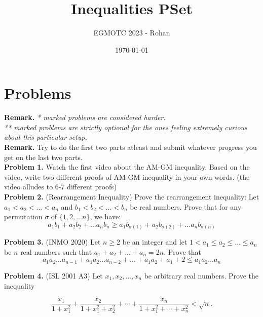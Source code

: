 \documentclass[12pt]{article}
\title{Inequalities PSet}
\author{EGMOTC 2023 - Rohan}
\date{\today}
\begin{document}
\maketitle

\newcommand{\localtextbulletone}{\textcolor{black}{\raisebox{.45ex}{\rule{.6ex}{.6ex}}}}
\renewcommand{\labelitemi}{\localtextbulletone}

\section*{Problems}
\vspace{1cm}
\thispagestyle{empty}

\textbf{Remark.} \textit{* marked problems are considered harder.\\ ** marked problems are strictly optional for the ones feeling extremely curious about this particular setup.\\}
\textbf{Remark.} Try to do the first two parts atleast and submit whatever progress you get on the last two parts.\\

\textbf{Problem 1.} Watch the first video about the AM-GM inequality. Based on the video, write two different proofs of AM-GM inequality in your own words. (the video alludes to 6-7 different proofs)\\

\textbf{Problem 2.} (Rearrangement Inequality) Prove the rearrangement inequality:
Let $a_1<a_2<\ldots <a_n$ and $b_1<b_2<\ldots < b_n$ be real numbers. Prove that for any permutation $\sigma$ of $\{1,2,\ldots n\}$, we have: \[a_1b_1+a_2b_2+\ldots a_nb_n \ge a_1b_{\sigma(1)}+a_2b_{\sigma(2)}+\ldots a_nb_{\sigma(n)}\]

\textbf{Problem 3.} (INMO 2020) Let $n \geqslant 2$ be an integer and let $1<a_1 \le a_2 \le \dots \le a_n$ be $n$ real numbers such that $a_1+a_2+\dots+a_n=2n$. Prove that \[a_1a_2\dots a_{n-1}+a_1a_2\dots a_{n-2}+\dots+a_1a_2+a_1+2 \leq a_1a_2\dots a_n\]

\textbf{Problem 4.} (ISL 2001 A3) Let $x_1,x_2,\ldots,x_n$ be arbitrary real numbers. Prove the inequality

\[
\frac{x_1}{1+x_1^2} + \frac{x_2}{1+x_1^2 + x_2^2} + \cdots +
\frac{x_n}{1 + x_1^2 + \cdots + x_n^2} < \sqrt{n}.
\]
\end{document}
